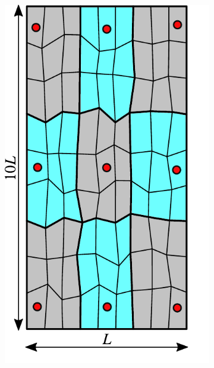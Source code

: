 \begin{figure} [htbp]
\begin{subfigure}[t]{0.22\textwidth}
  \centerline{\includegraphics[width=\linewidth]{figs/MsRSB/MPFA_9x9_a}}
  \caption{\label{fig:mpfa_demo_grid}}
\end{subfigure}
\hfill
\begin{subfigure}[t]{0.22\textwidth}

\end{subfigure}
\end{figure}
